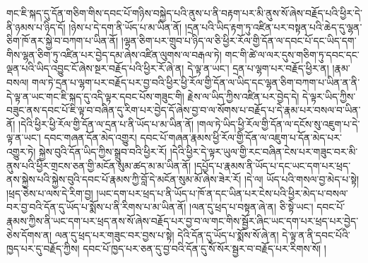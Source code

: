 གང་ཇི་སྐད་དུ་དོན་གཅིག་གིས་དབང་པོ་གཉིས་བསྐྱེད་པའི་ནུས་པ་ནི་བརྟག་པར་མི་ནུས་སོ་ཞེས་བརྗོད་པའི་ཕྱིར་དེ་ནི་ཉམས་པ་ཉིད་དོ། །ཉེས་པ་དེ་དག་ནི་ཡོད་པ་མ་ཡིན་ནོ། །དྲན་པའི་ཡིད་རྟག་ཏུ་འཛིན་པར་བསྟན་པའི་ཆེད་དུ་ལྷན་ཅིག་ཁོ་ནར་སྐྱེ་བ་བཀག་པ་ཡིན་ནོ། །ལྷན་ཅིག་པར་གྲུབ་པ་ཉིད་ལ་ཅི་ཕྱིར་རོལ་གྱི་དོན་ལ་དབང་པོ་དང་ཡིད་དག་གིས་ལྷན་ཅིག་ཏུ་འཛིན་པར་བྱེད་དམ་ཞེས་འཛིན་ལུགས་ལ་བརྒལ་ཏེ། གང་གི་ཚེ་ལ་ལར་དུས་གཅིག་ཏུ་དབང་དང་ལྡན་པའི་ཡིད་འབྱུང་ངོ་ཞེས་སྔར་བརྗོད་པའི་ཕྱིར་རོ་ཞེ་ན། དེ་ལྟ་ན་ཡང་། དྲན་པ་ལྷག་པར་བརྗོད་ཕྱིར་ན། །རྣམ་བསལ། གལ་ཏེ་དྲན་པ་ལྷག་པར་བརྗོད་པར་བྱ་བའི་ཕྱིར་ཕྱི་རོལ་གྱི་དོན་ལ་ཡིད་དང་ལྷན་ཅིག་བཀག་པ་ཡིན་ན་ནི་དེ་ལྟ་ན་ཡང་གང་ཇི་སྐད་དུ་འདི་ལྟར་དབང་པོས་གཟུང་གི། རྗེས་ལ་ཡིད་ཀྱིས་འཛིན་པར་བྱེད་དེ། དེ་ལྟར་ཡིད་ཀྱིས་བཟུང་ནས་དབང་པོ་ཇི་ལྟ་བ་བཞིན་དུ་རིག་པར་བྱེད་དོ་ཞེས་བྱ་བ་ལ་སོགས་པ་བརྗོད་པ་དེ་རྣམ་པར་བསལ་བ་ཡིན་ནོ། །དེའི་ཕྱིར་ཕྱི་རོལ་གྱི་དོན་ལ་དྲན་པ་ནི་ཡོད་པ་མ་ཡིན་ནོ། །གལ་ཏེ་ཡིད་ཕྱི་རོལ་གྱི་དོན་ལ་དངོས་སུ་འཇུག་པ་དེ་ལྟ་ན་ཡང་། དབང་གཞན་དོན་མེད་འགྱུར། དབང་པོ་གཞན་རྣམས་ཕྱི་རོལ་གྱི་དོན་ལ་འཇུག་པ་དོན་མེད་པར་འགྱུར་ཏེ། སྐྱེས་བུའི་དོན་ཡིད་ཀྱིས་སྒྲུབ་བའི་ཕྱིར་རོ། །དེའི་ཕྱིར་དེ་ལྟར་ཡུལ་གྱི་རང་བཞིན་ངེས་པར་གཟུང་བར་མི་ནུས་པའི་ཕྱིར་གྲངས་ཅན་གྱི་མངོན་སུམ་ཚད་མ་མ་ཡིན་ནོ། །དཔྱོད་པ་རྣམས་ནི་ཡོད་པ་དང་ཡང་དག་པར་ཕྲད་ནས་སྐྱེས་པའི་སྐྱེས་བུའི་དབང་པོ་རྣམས་ཀྱི་བློ་དེ་མངོན་སུམ་མོ་ཞེས་ཟེར་རོ། །དེ་ལ། ཡོད་པའི་གསལ་བྱ་མེད་པ་སྟེ། །ཕྲད་ཅེས་པ་ལས་དེ་རིག་བྱ། །ཡང་དག་པར་ཕྲད་པ་ནི་ཡོད་པ་ཁོ་ན་དང་ཡིན་པར་ངེས་པའི་ཕྱིར་མེད་པ་བསལ་བར་བྱ་བའི་དོན་དུ་ཡོད་པ་སྨོས་པ་ནི་རིགས་པ་མ་ཡིན་ནོ། །ལན་དུ་ཕྲད་པ་བསྟན་ཞེ་ན། ཅི་སྟེ་ཡང་། དབང་པོ་རྣམས་ཀྱིས་ནི་ཡང་དག་པར་ཕྲད་ནས་སོ་ཞེས་བརྗོད་པར་བྱ་བ་ལ་གང་གིས་སྦྱོར་ཞིང་ཡང་དག་པར་ཕྲད་པར་བྱེད་ཅེས་དོགས་ན། ལན་དུ་ཕྲད་པར་གཟུང་བར་བྱས་པ་སྟེ། དེའི་དོན་དུ་ཡོད་པ་སྨོས་སོ་ཞེ་ན། དེ་ལྟ་ན་ནི་དབང་པོའི་ཁྱད་པར་དུ་བརྗོད་ཀྱིས། དབང་པོ་ཁྱད་པར་ཅན་དུ་བྱ་བའི་དོན་དུ་སོ་སོར་སྦྱར་བ་བརྗོད་པར་རིགས་སོ། །
